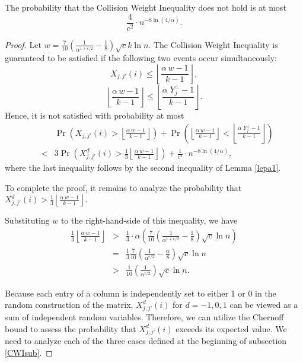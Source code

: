 \documentclass[11pt]{article}
\begin{document}
\begin{lemma}\label{CWIup}
The probability that the Collision Weight Inequality
does not hold is at most 
$$\frac{4}{c^2}\cdot n^{-8\ln(4/\alpha)} .$$
\end{lemma}
\begin{proof}
  Let $w = \frac{7}{10}\left(\frac{1}{\alpha^{1+\epsilon/2}} - \frac{1}{8} \right) \sqrt{c} k \ln n$.
The Collision Weight Inequality is guaranteed to be satisfied if the following two events occur
simultaneously:
\[
       X_{j,j'}(i) \le \left \lfloor \frac{\alpha\, w - 1}{k-1} \right \rfloor,
\]
\[
      \left \lfloor \frac{\alpha\, w - 1}{k-1} \right \rfloor 
      \le \left\lfloor \frac{\alpha  \; Y^{\perp}_j  - 1}{k - 1} \right\rfloor. 
\]
Hence, it is not satisfied with probability at most 
\begin{eqnarray}
 & &\Pr\left(X_{j,j'}(i) > \left \lfloor \frac{\alpha\, w - 1}{k-1} \right \rfloor \right) + 
    \Pr\left(\left \lfloor \frac{\alpha\, w - 1}{k-1} \right \rfloor 
    < \left\lfloor \frac{\alpha  \; Y^{\perp}_j  - 1}{k - 1} \right\rfloor\right) \nonumber \\
     & < & 
3 \Pr\left(X^d_{j,j'}(i) > \frac{1}{3} \left \lfloor \frac{\alpha\, w - 1}{k-1} \right \rfloor \right) +
    \frac{1}{c^2} \cdot n^{-8\ln(4/\alpha)}, \label{add}
\end{eqnarray}
where the last inequality follows by the second inequality of Lemma \ref{lepa1}. 

To complete the proof, it remains to analyze the probability that 
$X^d_{j,j'}(i) > \frac{1}{3} \left \lfloor \frac{\alpha\, w - 1}{k-1} \right \rfloor$.


Substituting $w$ to the right-hand-side of this inequality, we have
\begin{eqnarray}
\frac{1}{3}\left \lfloor \frac{\alpha\, w - 1}{k-1} \right \rfloor 
    & > & 
    \frac{1}{3} \cdot \alpha \left( \frac{7}{10} \left( \frac{1}{\alpha^{1+\epsilon/2}} - \frac{1}{8} \right) \sqrt{c} \ln n \right) \nonumber \\
    & = &
    \frac{1}{3} \frac{7}{10} \left( \frac{1}{\alpha^{\epsilon/2}} - \frac{\alpha}{8} \right) \sqrt{c} \ln n \nonumber \\
    & > &
    \frac{1}{10} \left( \frac{1}{\alpha^{\epsilon/2}}  \right) \sqrt{c} \ln n. \label{llas} 
\end{eqnarray}


Because each entry of a column is independently set to either 1 or 0 in the random construction of the matrix, 
$X^d_{j,j'}(i)$ for $d = -1, 0, 1$ can be viewed as a sum of independent random 
variables. Therefore, we can utilize the Chernoff bound to assess the probability that $X^d_{j,j'}(i)$ 
exceeds its expected value. 
We need to analyze each of the three cases defined at the beginning of subsection \ref{CWIsub}.


\end{proof}
\end{document}
